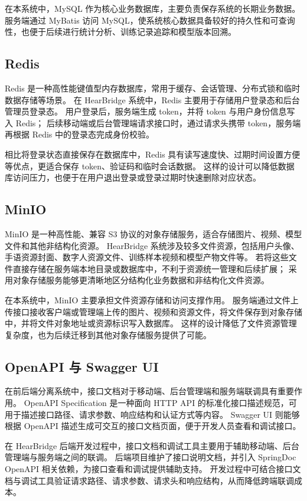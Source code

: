 在本系统中，MySQL 作为核心业务数据库，主要负责保存系统的长期业务数据。
服务端通过 MyBatis 访问 MySQL，使系统核心数据具备较好的持久性和可查询性，也便于后续进行统计分析、训练记录追踪和模型版本回溯。

\subsection{Redis}

Redis 是一种高性能键值型内存数据库，常用于缓存、会话管理、分布式锁和临时数据存储等场景\cite{redis-docs}。
在 HearBridge 系统中，Redis 主要用于存储用户登录态和后台管理员登录态。
用户登录后，服务端生成 token，并将 token 与用户身份信息写入 Redis；
后续移动端或后台管理端请求接口时，通过请求头携带 token，服务端再根据 Redis 中的登录态完成身份校验。

相比将登录状态直接保存在数据库中，Redis 具有读写速度快、过期时间设置方便等优点，更适合保存 token、验证码和临时会话数据。
这样的设计可以降低数据库访问压力，也便于在用户退出登录或登录过期时快速删除对应状态。

\subsection{MinIO}

MinIO 是一种高性能、兼容 S3 协议的对象存储服务，适合存储图片、视频、模型文件和其他非结构化资源\cite{minio-docs}。
HearBridge 系统涉及较多文件资源，包括用户头像、手语资源封面、数字人资源文件、训练样本视频和模型产物文件等。
若将这些文件直接存储在服务端本地目录或数据库中，不利于资源统一管理和后续扩展；
采用对象存储服务能够更清晰地区分结构化业务数据和非结构化文件资源。

在本系统中，MinIO 主要承担文件资源存储和访问支撑作用。
服务端通过文件上传接口接收客户端或管理端上传的图片、视频和资源文件，将文件保存到对象存储中，并将文件对象地址或资源标识写入数据库。
这样的设计降低了文件资源管理复杂度，也为后续迁移到其他对象存储服务提供了可能。

\subsection{OpenAPI 与 Swagger UI}

在前后端分离系统中，接口文档对于移动端、后台管理端和服务端联调具有重要作用。
OpenAPI Specification 是一种面向 HTTP API 的标准化接口描述规范，可用于描述接口路径、请求参数、响应结构和认证方式等内容\cite{openapi-320}。
Swagger UI 则能够根据 OpenAPI 描述生成可交互的接口文档页面，便于开发人员查看和调试接口\cite{swagger-ui}。

在 HearBridge 后端开发过程中，接口文档和调试工具主要用于辅助移动端、后台管理端与服务端之间的联调。
后端项目维护了接口说明文档，并引入 SpringDoc OpenAPI 相关依赖，为接口查看和调试提供辅助支持。
开发过程中可结合接口文档与调试工具验证请求路径、请求参数、请求头和响应结构，从而降低跨端联调成本。

